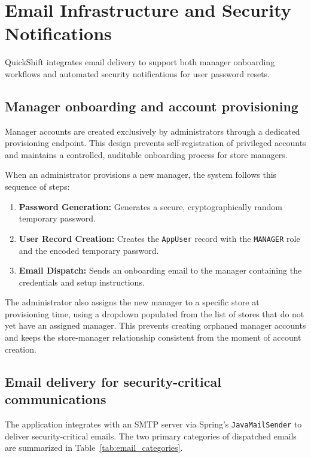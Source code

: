 \section{Email Infrastructure and Security Notifications}
\par QuickShift integrates email delivery to support both manager onboarding workflows and automated security notifications for user password resets.

\subsection{Manager onboarding and account provisioning}
\par Manager accounts are created exclusively by administrators through a dedicated provisioning endpoint. This design prevents self-registration of privileged accounts and maintains a controlled, auditable onboarding process for store managers.

\par When an administrator provisions a new manager, the system follows this sequence of steps:

\begin{enumerate}
    \item \textbf{Password Generation:} Generates a secure, cryptographically random temporary password.
    \item \textbf{User Record Creation:} Creates the \texttt{AppUser} record with the \texttt{MANAGER} role and the encoded temporary password.
    \item \textbf{Email Dispatch:} Sends an onboarding email to the manager containing the credentials and setup instructions.
\end{enumerate}

\par The administrator also assigns the new manager to a specific store at provisioning time, using a dropdown populated from the list of stores that do not yet have an assigned manager. This prevents creating orphaned manager accounts and keeps the store-manager relationship consistent from the moment of account creation.

\subsection{Email delivery for security-critical communications}
\par The application integrates with an SMTP server \cite{smtp_rfc5321} via Spring's \texttt{JavaMailSender} to deliver security-critical emails. The two primary categories of dispatched emails are summarized in Table~\ref{tab:email_categories}.

